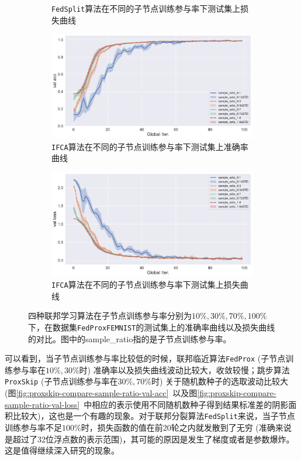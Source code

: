 \begin{figure}[H]
\begin{subfigure}{.5\textwidth}
  \caption{\texttt{FedSplit}算法在不同的子节点训练参与率下测试集上损失曲线}
  \label{fig:fedsplit-compare-sample-ratio-val-loss}
\end{subfigure}
\begin{subfigure}{.5\textwidth}
  \centering
  \includegraphics[width=.95\linewidth]{figures/ifca-compare-sample-ratio-val-acc.pdf}
  \caption{\texttt{IFCA}算法在不同的子节点训练参与率下测试集上准确率曲线}
  \label{fig:ifca-compare-sample-ratio-val-acc}
\end{subfigure}%
\begin{subfigure}{.5\textwidth}
  \centering
  \includegraphics[width=.95\linewidth]{figures/ifca-compare-sample-ratio-val-loss.pdf}
  \caption{\texttt{IFCA}算法在不同的子节点训练参与率下测试集上损失曲线}
  \label{fig:ifca-compare-sample-ratio-val-loss}
\end{subfigure}
\caption{四种联邦学习算法在子节点训练参与率分别为$10\%, 30\%, 70\%, 100\%$下，在数据集\texttt{FedProxFEMNIST}的测试集上的准确率曲线以及损失曲线的对比。图中的sample\_ratio指的是子节点训练参与率。}
\label{fig:compare-sample-ratio}
\end{figure}

可以看到，当子节点训练参与率比较低的时候，联邦临近算法\texttt{FedProx} (子节点训练参与率在$10\%, 30\%$时) 准确率以及损失曲线波动比较大，收敛较慢；跳步算法\texttt{ProxSkip} (子节点训练参与率在$30\%, 70\%$时) 关于随机数种子的选取波动比较大 (图\ref{fig:proxskip-compare-sample-ratio-val-acc}~以及图\ref{fig:proxskip-compare-sample-ratio-val-loss}~中相应的表示使用不同随机数种子得到结果标准差的阴影面积比较大)，这也是一个有趣的现象。对于联邦分裂算法\texttt{FedSplit}来说，当子节点训练参与率不足$100\%$时，损失函数的值在前20轮之内就发散到了无穷 (准确来说是超过了32位浮点数的表示范围)，其可能的原因是发生了梯度或者是参数爆炸。这是值得继续深入研究的现象。
